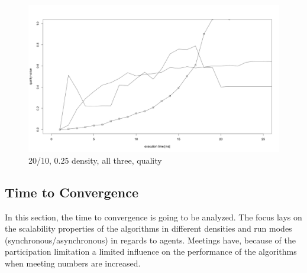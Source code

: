 \begin{figure}[H]
\centering
\includegraphics[width=430px]{graphics/experiments/static/quality/sq_2}
\caption{20/10, 0.25 density, all three, quality}
\label{fig:mgm_graph}
\end{figure}


\subsection{Time to Convergence}

In this section, the time to convergence is going to be analyzed. The focus lays on the scalability properties of the algorithms in different densities and run modes (synchronous/asynchronous) in regards to agents. Meetings have, because of the participation limitation a limited influence on the performance of the algorithms when meeting numbers are increased. 

%
%
%

